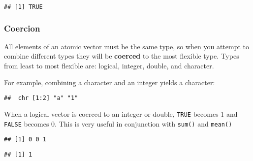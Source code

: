 \begin{verbatim}
## [1] TRUE
\end{verbatim}

\hypertarget{coercion}{%
\subsubsection{Coercion}\label{coercion}}

All elements of an atomic vector must be the same type, so when you
attempt to combine different types they will be \textbf{coerced} to the
most flexible type. Types from least to most flexible are: logical,
integer, double, and character. 

For example, combining a character and an integer yields a character:

\begin{Shaded}
\begin{Highlighting}[]
\NormalTok{(}\NormalTok{(}\NormalTok{, }\NormalTok{))}
\end{Highlighting}
\end{Shaded}

\begin{verbatim}
##  chr [1:2] "a" "1"
\end{verbatim}

When a logical vector is coerced to an integer or double, \texttt{TRUE}
becomes 1 and \texttt{FALSE} becomes 0. This is very useful in
conjunction with \texttt{sum()} and \texttt{mean()}

\begin{Shaded}
\begin{Highlighting}[]
\StringTok{ }\NormalTok{(}\NormalTok{, }\NormalTok{, }\NormalTok{)}
\end{Highlighting}
\end{Shaded}

\begin{verbatim}
## [1] 0 0 1
\end{verbatim}

\begin{Shaded}
\begin{Highlighting}[]
\end{Highlighting}
\end{Shaded}

\begin{verbatim}
## [1] 1
\end{verbatim}

